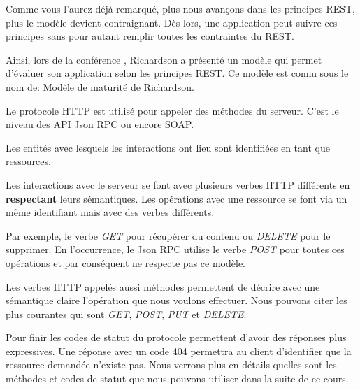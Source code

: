 \documentclass[big]{zmdocument}
\begin{document}
Comme vous l'aurez déjà remarqué, plus nous avançons dans les principes REST, plus le modèle devient contraignant. Dès lors, une application peut suivre ces principes sans pour autant remplir toutes les contraintes du REST.



Ainsi, lors de la conférence , Richardson a présenté un modèle qui permet d'évaluer son application selon les principes REST. Ce modèle est connu sous le nom de: Modèle de maturité de Richardson.





Le protocole HTTP est utilisé pour appeler des méthodes du serveur. C'est le niveau des API Json RPC ou encore SOAP.





Les entités avec lesquels les interactions ont lieu sont identifiées en tant que ressources.





Les interactions avec le serveur se font avec plusieurs verbes HTTP différents en \textbf{respectant} leurs sémantiques. Les opérations avec une ressource se font via un même identifiant mais avec des verbes différents.



Par exemple, le verbe \textit{GET} pour récupérer du contenu ou \textit{DELETE} pour le supprimer. En l'occurrence, le Json RPC utilise le verbe \textit{POST} pour toutes ces opérations et par conséquent ne respecte pas ce modèle.



\begin{Information}
Les verbes HTTP appelés aussi méthodes permettent de décrire avec une sémantique claire l'opération que nous voulons effectuer. Nous pouvons citer les plus courantes qui sont \textit{GET}, \textit{POST}, \textit{PUT} et \textit{DELETE}.
\end{Information}


Pour finir les codes de statut du protocole permettent d'avoir des réponses plus expressives. Une réponse avec un code 404 permettra au client d'identifier que la ressource demandée n'existe pas.
Nous verrons plus en détails quelles sont les méthodes et codes de statut que nous pouvons utiliser dans la suite de ce cours.
\end{document}
